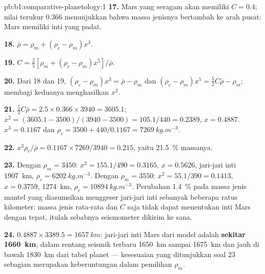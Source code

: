 \begin{solution}{pb:b1:comparative-planetology:1}
\textbf{17.} Mars yang seragam akan memiliki $C = 0.4$; nilai terukur 0.366 menunjukkan bahwa massa jenisnya bertambah ke arah pusat: Mars memiliki inti yang padat.

\textbf{18.} $\bar\rho = \rho_m + (\rho_c - \rho_m)x^3$.

\textbf{19.} $C = \tfrac25[\rho_m + (\rho_c - \rho_m)x^5]/\bar\rho$.

\textbf{20.} Dari 18 dan 19, $(\rho_c - \rho_m)x^3 = \bar\rho - \rho_m$ dan
$(\rho_c - \rho_m)x^5 = \tfrac52C\bar\rho - \rho_m$; membagi keduanya menghasilkan $x^2$.

\textbf{21.} $\tfrac52C\bar\rho = 2.5\times0.366\times3940 = 3605.1$;
$x^2 = (3605.1 - 3500)/(3940 - 3500) = 105.1/440 = 0.2389$, $x = 0.4887$.
$x^3 = 0.1167$ dan $\rho_c = 3500 + 440/0.1167 = \qty{7269}{kg.m^{-3}}$.

\textbf{22.} $x^3\rho_c/\bar\rho = 0.1167\times7269/3940 = 0.215$, yaitu
\qty{21.5}{\percent} massanya.

\textbf{23.} Dengan $\rho_m = 3450$: $x^2 = 155.1/490 = 0.3165$, $x = 0.5626$,
jari-jari inti \qty{1907}{km}, $\rho_c = \qty{6202}{kg.m^{-3}}$. Dengan $\rho_m =
3550$: $x^2 = 55.1/390 = 0.1413$, $x = 0.3759$, \qty{1274}{km},
$\rho_c = \qty{10894}{kg.m^{-3}}$. Perubahan \qty{1.4}{\percent} pada massa jenis mantel yang diasumsikan menggeser jari-jari inti sebanyak beberapa ratus kilometer: massa jenis rata-rata dan $C$ saja tidak dapat menentukan inti Mars dengan tepat, itulah sebabnya seismometer dikirim ke sana.

\textbf{24.} $0.4887\times3389.5 = \qty{1657}{km}$: jari-jari inti Mars dari model adalah \textbf{sekitar \qty[text-series-to-math=true]{1660}{km}}, dalam rentang seismik terbaru \qty{1650}{km} sampai \qty{1675}{km} dan jauh di bawah \qty{1830}{km} dari tabel planet --- kesesuaian yang ditunjukkan soal 23 sebagian merupakan keberuntungan dalam pemilihan $\rho_m$.
\end{solution}
